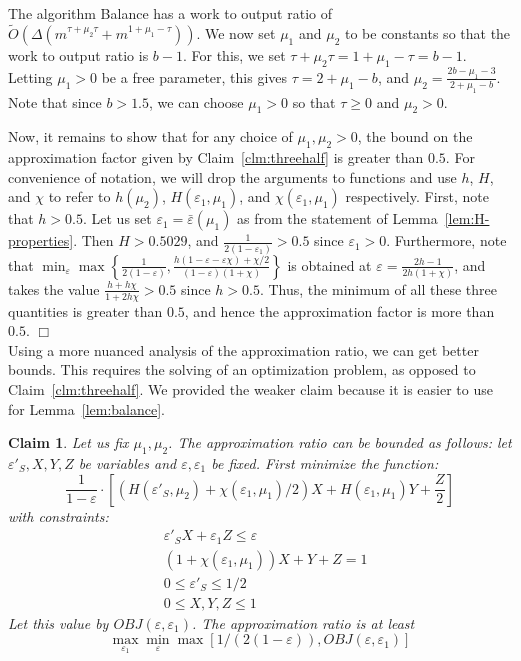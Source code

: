 \documentclass[11pt]{article}
\newtheorem{claim}[theorem]{Claim}
\newenvironment{myproof}{\noindent {\sc Proof:}}{$\Box$}
\def\epsilon{\varepsilon}
\newcommand\Balance{{\sc Balance}\xspace}
\newcommand\otilde{\widetilde{O}}
\begin{document}
\begin{myproof}
The algorithm {\Balance} has a work to output ratio of
$\otilde(\Delta (m^{\tau+\mu_2\tau} + m^{1+\mu_1-\tau}))$. We now set $\mu_1$ and
$\mu_2$ to be constants so that the work to output ratio is $b - 1$. For
this, we set $\tau+\mu_2\tau = 1+\mu_1-\tau = b - 1$. Letting $\mu_1 > 0$
be a free parameter, this gives $\tau = 2 + \mu_1 - b$, and $\mu_2 =
\frac{2b - \mu_1 - 3}{2 + \mu_1 - b}$. Note that since $b >
1.5$, we can choose $\mu_1 > 0$ so that $\tau \geq 0$ and $\mu_2 > 0$.

Now, it remains to show that for any choice of $\mu_1, \mu_2 > 0$, the bound on
the approximation factor given by Claim~\ref{clm:threehalf} is greater than
$0.5$. For convenience of notation, we will drop the arguments to functions and
use $h$, $H$, and $\chi$ to refer to $h(\mu_2)$, $H(\epsilon_1, \mu_1)$, and
$\chi(\epsilon_1, \mu_1)$ respectively. First, note that $h > 0.5$. Let us set
$\epsilon_1 = \bar{\epsilon}(\mu_1)$ as from the statement of
Lemma~\ref{lem:H-properties}. Then $H > 0.5029$, and $\frac{1}{2(1-\epsilon_1)}
> 0.5$ since $\epsilon_1 > 0$. Furthermore, note that
$\min_{\epsilon}\max\left\{\frac{1}{2(1-\epsilon)}, \frac{h
(1-\epsilon-\epsilon\chi) + \chi/2}{(1-\epsilon)(1+\chi)} \right\}$ is obtained
at $\epsilon = \frac{2h - 1}{2h(1 + \chi)}$, and takes the value $\frac{h +
h\chi}{1 + 2h\chi} > 0.5$ since $h > 0.5$. Thus, the minimum of all these three
quantities is greater than $0.5$, and hence the approximation factor is more
than $0.5$.
\end{myproof}\\

Using a more nuanced analysis of the approximation ratio, we can
get better bounds. This requires the solving of an optimization
problem, as opposed to Claim~\ref{clm:threehalf}. We provided
the weaker claim because it is easier to use for Lemma~\ref{lem:balance}.


\begin{claim} \label{clm:lp} Let us fix $\mu_1, \mu_2$. The approximation ratio
can be bounded as follows: let $\epsilon'_S, X, Y, Z$ be variables and $\epsilon, \epsilon_1$ be
fixed. First minimize the function:
$$ \frac{1}{1-\epsilon}\cdot \left[(H(\epsilon'_S,\mu_2) + \chi(\epsilon_1,\mu_1)/2)X
+ H(\epsilon_1,\mu_1) Y + \frac{Z}{2}\right] $$
with constraints:
\begin{eqnarray*}
& \epsilon'_S X + \epsilon_1 Z \leq \epsilon \\
& (1+\chi(\epsilon_1,\mu_1))X + Y + Z = 1 \\
& 0 \leq \epsilon'_S \leq 1/2\\
& 0 \leq X, Y, Z \leq 1
\end{eqnarray*}
Let this value by $OBJ(\epsilon,\epsilon_1)$. The approximation ratio is at least
$$\max_{\epsilon_1} \min_{\epsilon} \max[1/(2(1-\epsilon)), OBJ(\epsilon,\epsilon_1)]$$
\end{claim}
\end{document}
